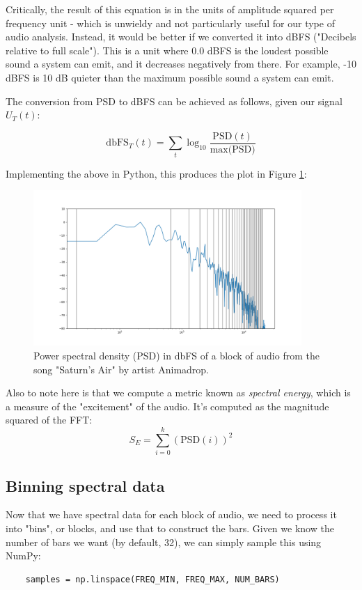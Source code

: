 \documentclass[11pt]{article}
\begin{document}
Critically, the result of this equation is in the units of amplitude squared per frequency unit - which is
unwieldy and not particularly useful for our type of audio analysis. Instead, it would be better if we
converted it into dBFS ("Decibels relative to full scale"). This is a unit where 0.0 dBFS is the loudest
possible sound a system can emit, and it decreases negatively from there. For example, -10 dBFS is 10 dB
quieter than the maximum possible sound a system can emit.

The conversion from PSD to dBFS can be achieved as follows, given our signal $U_T(t)$:

$$\text{dbFS}_T(t) = \sum_t \log_{10} \frac{\text{PSD}(t)}{\text{max(PSD)}}$$

Implementing the above in Python, this produces the plot in Figure \ref{fig:psd}:

\begin{figure}[H]
\centering
\includegraphics[width=385px]{img/psd.png}
\caption{Power spectral density (PSD) in dbFS of a block of audio from the song "Saturn's Air" by
    artist Animadrop.}
\label{fig:psd}
\end{figure}

Also to note here is that we compute a metric known as \textit{spectral energy}, which is a measure of the
"excitement" of the audio. It's computed as the magnitude squared of the FFT:
$$S_E = \sum_{i=0}^{k} (\text{PSD}(i))^2$$

\subsection{Binning spectral data}
Now that we have spectral data for each block of audio, we need to process it into "bins", or blocks, and use
that to construct the bars. Given we know the number of bars we want (by default, 32), we can simply sample
this using NumPy:

\begin{verbatim}
    samples = np.linspace(FREQ_MIN, FREQ_MAX, NUM_BARS)
\end{verbatim}
\end{document}
